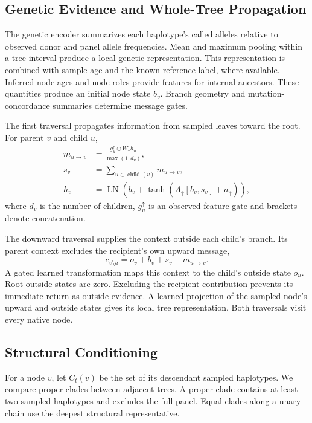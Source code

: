 \documentclass[letterpaper]{article}
\begin{document}
\subsection{Genetic Evidence and Whole-Tree Propagation}
The genetic encoder summarizes each haplotype's called alleles relative to observed donor and panel allele frequencies. Mean and maximum pooling within a tree interval produce a local genetic representation. This representation is combined with sample age and the known reference label, where available. Inferred node ages and node roles provide features for internal ancestors. These quantities produce an initial node state $b_v$. Branch geometry and mutation-concordance summaries determine message gates.

The first traversal propagates information from sampled leaves toward the root. For parent $v$ and child $u$,
\begin{align}
m_{u\to v}
 &=\frac{g_u^\uparrow\odot W_\uparrow h_u}{\max(1,d_v)},\\
s_v&=\sum_{u\in\operatorname{child}(v)}m_{u\to v},\\
h_v&=\operatorname{LN}\!\left(
 b_v+\tanh(A_\uparrow[b_v,s_v]+a_\uparrow)\right),
\end{align}
where $d_v$ is the number of children, $g_u^\uparrow$ is an observed-feature gate and brackets denote concatenation.

The downward traversal supplies the context outside each child's branch. Its parent context excludes the recipient's own upward message,
\begin{equation}
c_{v\setminus u}=o_v+b_v+s_v-m_{u\to v}.
\label{eq:cavity}
\end{equation}
A gated learned transformation maps this context to the child's outside state $o_u$. Root outside states are zero. Excluding the recipient contribution prevents its immediate return as outside evidence. A learned projection of the sampled node's upward and outside states gives its local tree representation. Both traversals visit every native node.

\subsection{Structural Conditioning}
For a node $v$, let $C_t(v)$ be the set of its descendant sampled haplotypes. We compare proper clades between adjacent trees. A proper clade contains at least two sampled haplotypes and excludes the full panel. Equal clades along a unary chain use the deepest structural representative.
\end{document}
